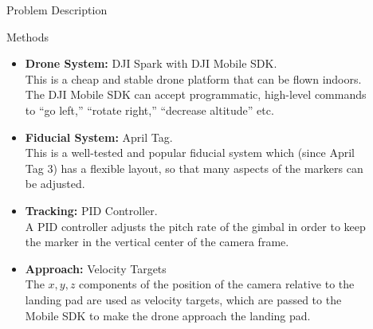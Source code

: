 \documentclass[final, 20pt]{beamer}
\newlength{\sepwidth}
\newlength{\colwidth}
\newcommand{\separatorcolumn}{\begin{column}{\sepwidth}\end{column}}
\begin{document}
\begin{frame}[t]
\begin{columns}[t]
\begin{column}{\colwidth}
\begin{alertblock}{Problem Description}
  \end{alertblock}

  \begin{block}{Methods}

    \begin{itemize}
      \item \textbf{Drone System:} DJI Spark with DJI Mobile SDK.\\This is a cheap and stable drone platform that can be flown indoors.
                    The DJI Mobile SDK can accept programmatic, high-level commands to ``go left,'' ``rotate right,'' ``decrease altitude'' etc.
      \item \textbf{Fiducial System:} April Tag.\\This is a well-tested and popular fiducial system which (since April Tag 3) has a flexible layout,
                    so that many aspects of the markers can be adjusted.
      \item \textbf{Tracking:} PID Controller.\\A PID controller adjusts the pitch rate of the gimbal
                    in order to keep the marker in the vertical center of the camera frame.
      \item \textbf{Approach:} Velocity Targets\\The $x,y,z$ components of the position of the camera
                    relative to the landing pad are used as velocity targets, which are passed to the Mobile SDK to make the drone approach the landing pad.
    \end{itemize}

  \end{block}

\end{column}

\separatorcolumn

\begin{column}{\colwidth}


\end{column}
\end{columns}
\end{frame}
\end{document}
